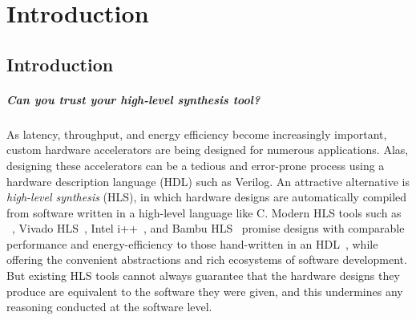 \chapter{Introduction}

\section{Introduction}
\label{sec:intro}




\paragraph{Can you trust your high-level synthesis tool?}

As latency, throughput, and energy efficiency become increasingly important, custom hardware accelerators are being designed for numerous applications. %
Alas, designing these accelerators can be a tedious and error-prone process using a hardware description language (HDL) such as Verilog.
An attractive alternative is \emph{high-level synthesis} (HLS), in which hardware designs are automatically compiled from software written in a high-level language like C.
Modern HLS tools such as \legup{}~\cite{canis11_legup}, Vivado HLS~\cite{xilinx20_vivad_high_synth}, Intel i++~\cite{intel_hls}, and Bambu HLS~\cite{bambu_hls} promise designs with comparable performance and energy-efficiency to those hand-written in an HDL~\cite{homsirikamol+14, silexicahlshdl, 7818341}, while offering the convenient abstractions and rich ecosystems of software development.
But existing HLS tools cannot always guarantee that the hardware designs they produce are equivalent to the software they were given, and this undermines any reasoning conducted at the software level.

